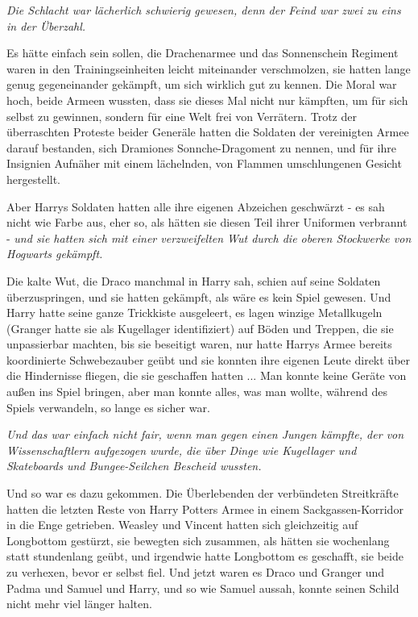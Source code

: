 \emph{Die Schlacht war lächerlich schwierig gewesen, denn der Feind war zwei zu
eins in der Überzahl.}

Es hätte einfach sein sollen, die Drachenarmee und das Sonnenschein Regiment
waren in den Trainingseinheiten leicht miteinander verschmolzen, sie hatten
lange genug gegeneinander gekämpft, um sich wirklich gut zu kennen. Die Moral
war hoch, beide Armeen wussten, dass sie dieses Mal nicht nur kämpften, um für
sich selbst zu gewinnen, sondern für eine Welt frei von Verrätern. Trotz der
überraschten Proteste beider Generäle hatten die Soldaten der vereinigten Armee
darauf bestanden, sich Dramiones Sonnche-Dragoment zu nennen, und für ihre
Insignien Aufnäher mit einem lächelnden, von Flammen umschlungenen Gesicht
hergestellt.

Aber Harrys Soldaten hatten alle ihre eigenen Abzeichen geschwärzt - es sah
nicht wie Farbe aus, eher so, als hätten sie diesen Teil ihrer Uniformen
verbrannt - \emph{und sie hatten sich mit einer verzweifelten Wut durch die
oberen Stockwerke von Hogwarts gekämpft.}

Die kalte Wut, die Draco manchmal in Harry sah, schien auf seine Soldaten
überzuspringen, und sie hatten gekämpft, als wäre es kein Spiel gewesen. Und
Harry hatte seine ganze Trickkiste ausgeleert, es lagen winzige Metallkugeln
(Granger hatte sie als \glqq{}Kugellager\grqq{} identifiziert) auf Böden und
Treppen, die sie unpassierbar machten, bis sie beseitigt waren, nur hatte Harrys
Armee bereits koordinierte Schwebezauber geübt und sie konnten ihre eigenen
Leute direkt über die Hindernisse fliegen, die sie geschaffen hatten ... Man
konnte keine Geräte von außen ins Spiel bringen, aber man konnte alles, was man
wollte, während des Spiels verwandeln, so lange es sicher war.

\emph{Und das war einfach nicht fair, wenn man gegen einen Jungen kämpfte, der
von Wissenschaftlern aufgezogen wurde, die über Dinge wie Kugellager und
Skateboards und Bungee-Seilchen Bescheid wussten.}

Und so war es dazu gekommen. Die Überlebenden der verbündeten Streitkräfte
hatten die letzten Reste von Harry Potters Armee in einem Sackgassen-Korridor in
die Enge getrieben. Weasley und Vincent hatten sich gleichzeitig auf Longbottom
gestürzt, sie bewegten sich zusammen, als hätten sie wochenlang statt
stundenlang geübt, und irgendwie hatte Longbottom es geschafft, sie beide zu
verhexen, bevor er selbst fiel. Und jetzt waren es Draco und Granger und Padma
und Samuel und Harry, und so wie Samuel aussah, konnte seinen Schild nicht mehr
viel länger halten.

